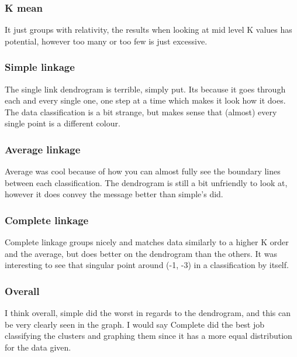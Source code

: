 \documentclass[12pt]{article}
\begin{document}
\subsubsection{K mean}
It just groups with relativity, the results when looking at mid level K values has potential, however too many or too few is just excessive.

\subsubsection{Simple linkage}
The single link dendrogram is terrible, simply put. Its because it goes through each and every single one, one step at a time which makes it look how it does. The data classification is a bit strange, but makes sense that (almost) every single point is a different colour.

\subsubsection{Average linkage}
Average was cool because of how you can almost fully see the boundary lines between each classification. The dendrogram is still a bit unfriendly to look at, however it does convey the message better than simple's did.

\subsubsection{Complete linkage}
Complete linkage groups nicely and matches data similarly to a higher K order and the average, but does better on the dendrogram than the others. It was interesting to see that singular point around (-1, -3) in a classification by itself.


\subsubsection{Overall}
I think overall, simple did the worst in regards to the dendrogram, and this can be very clearly seen in the graph. I would say Complete did the best job classifying the clusters and graphing them since it has a more equal distribution for the data given.

\end{document}
